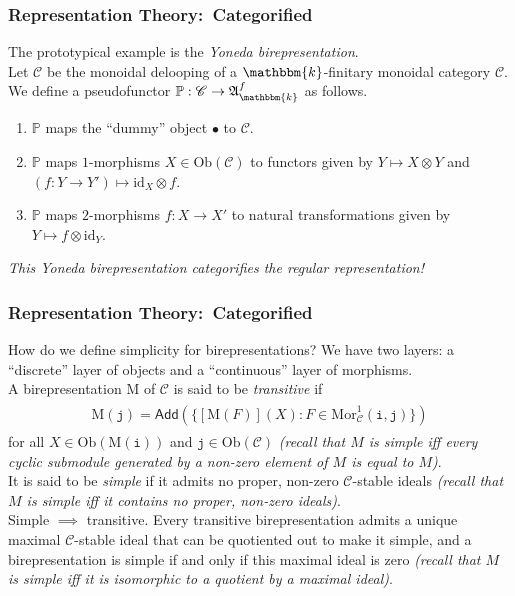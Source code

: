 \documentclass{beamer}
\newcommand{\id}{\mathrm{id}}
\newcommand{\obset}{\mathrm{Ob}}
\newcommand{\morset}{\mathrm{Mor}}
\newcommand{\textobj}[1]{\mathrm{\texttt{#1}}}
\newcommand*{\emphasis}[1]{\textcolor{structure}{\em #1}}
\begin{document}
\begin{frame}
\frametitle{Representation Theory:\ Categorified}
The prototypical example is the \emphasis{Yoneda birepresentation}.\\[2ex]
Let $\mathscr{C}$ be the monoidal delooping of a $\mathbbm{k}$-finitary monoidal category $\mathcal{C}$. We define a pseudofunctor $\mathbb{P} : \mathscr{C} \to \mathfrak{A}_\mathbbm{k}^f$ as follows.\\[2ex]
\begin{enumerate}
\item $\mathbb{P}$ maps the ``dummy'' object $\bullet$ to $\mathcal{C}$.
\item $\mathbb{P}$ maps $1$-morphisms $X \in \obset(\mathcal{C})$ to functors given by $Y \mapsto X \otimes Y$ and $(f : Y \to Y') \mapsto \id_X \otimes f$.
\item $\mathbb{P}$ maps $2$-morphisms $f : X \to X'$ to natural transformations given by $Y \mapsto f \otimes \id_Y$.\\[2ex]
\end{enumerate}
\emphasis{This Yoneda birepresentation categorifies the regular representation!}
\end{frame}

\begin{frame}
\frametitle{Representation Theory:\ Categorified}
How do we define simplicity for birepresentations? We have two layers: a ``discrete'' layer of objects and a ``continuous'' layer of morphisms.\\[2ex]
A birepresentation $\mathrm{M}$ of $\mathscr{C}$ is said to be \emphasis{transitive} if
\begin{align*}
\begin{split}
\mathrm{M}(\textobj{j}) = \textsf{Add}(\{[\mathrm{M}(F)](X) : F \in \morset_\mathscr{C}^1(\textobj{i}, \textobj{j})\})
\end{split}
\end{align*}
for all $X \in \obset(\mathrm{M}(\textobj{i}))$ and $\textobj{j} \in \obset(\mathscr{C})$ \emphasis{(recall that $M$ is simple iff every cyclic submodule generated by a non-zero element of $M$ is equal to $M$)}.\\[2ex]
It is said to be \emphasis{simple} if it admits no proper, non-zero $\mathscr{C}$-stable ideals \emphasis{(recall that $M$ is simple iff it contains no proper, non-zero ideals)}.\\[2ex]
Simple $\implies$ transitive. Every transitive birepresentation admits a unique maximal $\mathscr{C}$-stable ideal that can be quotiented out to make it simple, and a birepresentation is simple if and only if this maximal ideal is zero \emphasis{(recall that $M$ is simple iff it is isomorphic to a quotient by a maximal ideal)}.
\end{frame}
\end{document}
